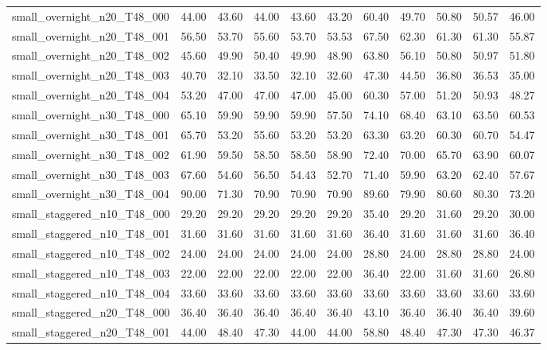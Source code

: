 \begin{table}[htbp]
\begin{tabular}{lrrrrrrrrrr}
small\_overnight\_n20\_T48\_000 & 44.00 & 43.60 & 44.00 & 43.60 & 43.20 & 60.40 & 49.70 & 50.80 & 50.57 & 46.00 \\
small\_overnight\_n20\_T48\_001 & 56.50 & 53.70 & 55.60 & 53.70 & 53.53 & 67.50 & 62.30 & 61.30 & 61.30 & 55.87 \\
small\_overnight\_n20\_T48\_002 & 45.60 & 49.90 & 50.40 & 49.90 & 48.90 & 63.80 & 56.10 & 50.80 & 50.97 & 51.80 \\
small\_overnight\_n20\_T48\_003 & 40.70 & 32.10 & 33.50 & 32.10 & 32.60 & 47.30 & 44.50 & 36.80 & 36.53 & 35.00 \\
small\_overnight\_n20\_T48\_004 & 53.20 & 47.00 & 47.00 & 47.00 & 45.00 & 60.30 & 57.00 & 51.20 & 50.93 & 48.27 \\
small\_overnight\_n30\_T48\_000 & 65.10 & 59.90 & 59.90 & 59.90 & 57.50 & 74.10 & 68.40 & 63.10 & 63.50 & 60.53 \\
small\_overnight\_n30\_T48\_001 & 65.70 & 53.20 & 55.60 & 53.20 & 53.20 & 63.30 & 63.20 & 60.30 & 60.70 & 54.47 \\
small\_overnight\_n30\_T48\_002 & 61.90 & 59.50 & 58.50 & 58.50 & 58.90 & 72.40 & 70.00 & 65.70 & 63.90 & 60.07 \\
small\_overnight\_n30\_T48\_003 & 67.60 & 54.60 & 56.50 & 54.43 & 52.70 & 71.40 & 59.90 & 63.20 & 62.40 & 57.67 \\
small\_overnight\_n30\_T48\_004 & 90.00 & 71.30 & 70.90 & 70.90 & 70.90 & 89.60 & 79.90 & 80.60 & 80.30 & 73.20 \\
small\_staggered\_n10\_T48\_000 & 29.20 & 29.20 & 29.20 & 29.20 & 29.20 & 35.40 & 29.20 & 31.60 & 29.20 & 30.00 \\
small\_staggered\_n10\_T48\_001 & 31.60 & 31.60 & 31.60 & 31.60 & 31.60 & 36.40 & 31.60 & 31.60 & 31.60 & 36.40 \\
small\_staggered\_n10\_T48\_002 & 24.00 & 24.00 & 24.00 & 24.00 & 24.00 & 28.80 & 24.00 & 28.80 & 28.80 & 24.00 \\
small\_staggered\_n10\_T48\_003 & 22.00 & 22.00 & 22.00 & 22.00 & 22.00 & 36.40 & 22.00 & 31.60 & 31.60 & 26.80 \\
small\_staggered\_n10\_T48\_004 & 33.60 & 33.60 & 33.60 & 33.60 & 33.60 & 33.60 & 33.60 & 33.60 & 33.60 & 33.60 \\
small\_staggered\_n20\_T48\_000 & 36.40 & 36.40 & 36.40 & 36.40 & 36.40 & 43.10 & 36.40 & 36.40 & 36.40 & 39.60 \\
small\_staggered\_n20\_T48\_001 & 44.00 & 48.40 & 47.30 & 44.00 & 44.00 & 58.80 & 48.40 & 47.30 & 47.30 & 46.37 \\

\end{tabular}
\end{table}
